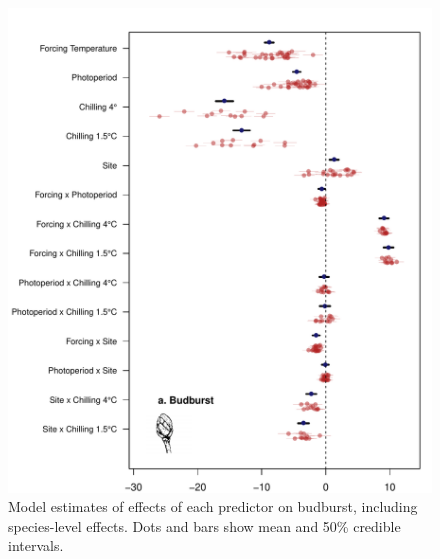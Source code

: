 \documentclass{article}
\begin{document}
\begin{figure}
\label{figS2}
\includegraphics[width=1\textwidth, page=1]{Fig1_bb_lo+sp} %
\caption{Model estimates of effects of each predictor on budburst, including species-level effects. Dots and bars show mean and 50\% credible intervals.}
\end{figure}

\clearpage
\end{document}
